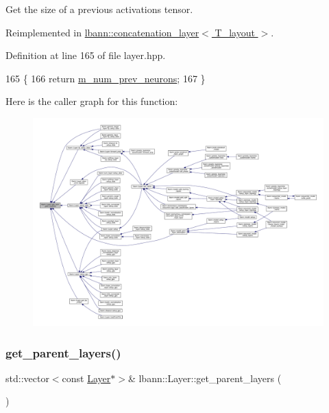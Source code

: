 Get the size of a previous activations tensor. 

Reimplemented in \hyperlink{classlbann_1_1concatenation__layer_aca8e6d21d827a3d5a8434db88bf3e63a}{lbann\+::concatenation\+\_\+layer$<$ T\+\_\+layout $>$}.



Definition at line 165 of file layer.\+hpp.


\begin{DoxyCode}
165                                                                \{
166     \textcolor{keywordflow}{return} \hyperlink{classlbann_1_1Layer_ac7b30f4e28d58204bfcbb76886f9136d}{m\_num\_prev\_neurons};
167   \}
\end{DoxyCode}
Here is the caller graph for this function\+:\nopagebreak
\begin{figure}[H]
\begin{center}
\leavevmode
\includegraphics[width=350pt]{classlbann_1_1Layer_a27112eb70bbfbd7f3c3e749960400dec_icgraph}
\end{center}
\end{figure}
\mbox{\label{classlbann_1_1Layer_a898e72b93752abf52d35b06459cd360e}} 
\subsubsection{\texorpdfstring{get\+\_\+parent\+\_\+layers()}{get\_parent\_layers()}\hspace{0.1cm}{\footnotesize\ttfamily [1/2]}}
{\footnotesize\ttfamily std\+::vector$<$const \hyperlink{classlbann_1_1Layer}{Layer}$\ast$$>$\& lbann\+::\+Layer\+::get\+\_\+parent\+\_\+layers (\begin{DoxyParamCaption}{ }\end{DoxyParamCaption})\hspace{0.3cm}{\ttfamily [inline]}}

